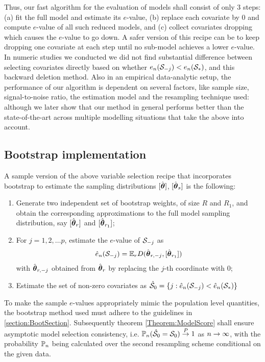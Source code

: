 Thus, our fast algorithm for the evaluation of models shall consist of only 3 steps: (a) fit the full model and estimate its $e$-value, (b) replace each covariate by 0 and compute $e$-value of all such reduced models, and (c) collect covariates dropping which causes the $e$-value to go down. A safer version of this recipe can be to keep dropping one covariate at each step until no sub-model achieves a lower $e$-value. In numeric studies we conducted we did not find substantial difference between selecting covariates directly based on whether $e_n ({\cal{S}}_{-j}) < e_n ({\cal{S}}_*)$, and this backward deletion method. Also in an empirical data-analytic setup, the performance of our algorithm is dependent on several factors, like sample size, signal-to-noise ratio, the estimation model and the resampling technique used: although we later show that our method in general performs better than the state-of-the-art across multiple modelling situations that take the above into account.

\subsection{Bootstrap implementation}
A sample version of the above variable selection recipe that incorporates bootstrap to estimate the sampling distributions $[ \hat{{\boldsymbol{\theta}}} ]$, $[\hat {{\boldsymbol{\theta}}}_s ]$ is the following:

\begin{enumerate}
\item Generate two independent set of bootstrap weights, of size $R$ and $R_1$, and obtain the corresponding approximations to the full model sampling distribution, say $[ \hat{{\boldsymbol{\theta}}}_{r} ]$ and $[ \hat{{\boldsymbol{\theta}}}_{r_1} ]$;

\item For $j = 1,2,\ldots p$, estimate the $e$-value of ${\cal{S}}_{-j}$ as
%
\begin{align}\label{equation:BootEValue}
\hat e_n ({\cal{S}}_{-j}) = {\mathbb{E}}_r D( \hat {{\boldsymbol{\theta}}}_{r,-j}, [ \hat {{\boldsymbol{\theta}}}_{r_1} ])
\end{align}
%
with $\hat {{\boldsymbol{\theta}}}_{r,-j}$ obtained from $\hat {{\boldsymbol{\theta}}}_{r}$ by replacing the $j$-th coordinate with 0;

\item Estimate the set of non-zero covariates as $\hat {{\cal{S}}}_{0} = \lbrace j: \hat e_{n} ({\cal{S}}_{-j}) < \hat e_{n} ({\cal{S}}_{*}) \}$
\end{enumerate}

To make the sample $e$-values appropriately mimic the population level quantities, the bootstrap method used must adhere to the guidelines in \ref{section:BootSection}. Subsequently theorem \ref{Theorem:ModelScore} shall ensure asymptotic model selection consistency, i.e. ${\mathbb{P}}_n ( \hat {{\cal{S}}}_0 = {\cal{S}}_0 ) \stackrel{P}{\rightarrow} 1$ as $n \rightarrow \infty$, with the probability ${\mathbb{P}}_n$ being calculated over the second resampling scheme conditional on the given data.

